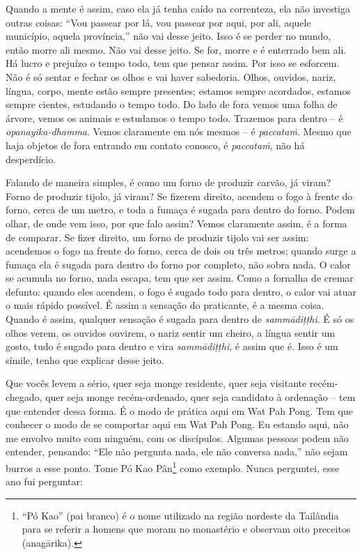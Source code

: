 Quando a mente é assim, caso ela já tenha caído na correnteza, ela
não investiga outras coisas: “Vou passear por lá, vou passear por aqui,
por ali, aquele município, aquela província,” não vai desse jeito. Isso
é se perder no mundo, então morre ali mesmo. Não vai desse jeito. Se
for, morre e é enterrado bem ali. Há lucro e prejuízo o tempo todo, tem
que pensar assim. Por isso se esforcem. Não é só sentar e fechar os
olhos e vai haver sabedoria. Olhos, ouvidos, nariz, língua, corpo,
mente estão sempre presentes; estamos sempre acordados, estamos sempre
cientes, estudando o tempo todo. Do lado de fora vemos uma folha de
árvore, vemos os animais e estudamos o tempo todo. Trazemos para dentro
– é \emph{opanayika-dhamma}. Vemos claramente em nós mesmos – é
\emph{paccataṁ}. Mesmo que haja objetos de fora entrando em contato
conosco, é \emph{paccataṁ}, não há desperdício. 

Falando de maneira simples, é como um forno de produzir carvão, já
viram? Forno de produzir tijolo, já viram? Se fizerem direito, acendem
o fogo à frente do forno, cerca de um metro, e toda a fumaça é sugada
para dentro do forno. Podem olhar, de onde vem isso, por que falo
assim? Vemos claramente assim, é a forma de comparar. Se fizer direito,
um forno de produzir tijolo vai ser assim: acendemos o fogo na frente
do forno, cerca de dois ou três metros; quando surge a fumaça ela é
sugada para dentro do forno por completo, não sobra nada. O calor se
acumula no forno, nada escapa, tem que ser assim. Como a fornalha de
cremar defunto: quando eles acendem, o fogo é sugado todo para dentro,
o calor vai atuar o mais rápido possível. É assim a sensação do
praticante, é a mesma coisa. Quando é assim, qualquer sensação é sugada
para dentro de \emph{sammādiṭṭhi}. É só os olhos verem, os ouvidos
ouvirem, o nariz sentir um cheiro, a língua sentir um gosto, tudo é
sugado para dentro e vira \emph{sammādiṭṭhi}, é assim que é. Isso é
um símile, tenho que explicar desse jeito.

Que vocês levem a sério, quer seja monge residente, quer seja
visitante recém-chegado, quer seja monge recém-ordenado, quer seja
candidato à ordenação – tem que entender dessa forma. É o modo de
prática aqui em Wat Pah Pong. Tem que conhecer o modo de se comportar
aqui em Wat Pah Pong. Eu estando aqui, não me envolvo muito com
ninguém, com os discípulos. Algumas pessoas podem não entender,
pensando: “Ele não pergunta nada, ele não conversa nada,” não sejam
burros a esse ponto. Tome Pó Kao Pân\footnote{“Pó Kao” (pai branco) é o
nome utilizado na região nordeste da Tailândia para se referir a homens
que moram no monastério e observam oito preceitos (anagārika).} como
exemplo. Nunca perguntei, esse ano fui perguntar: 


